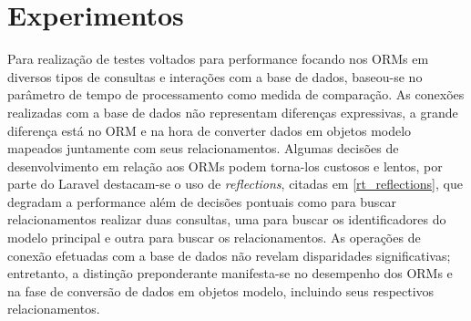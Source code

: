 \section{Experimentos}
Para realização de testes voltados para performance focando nos ORMs em diversos tipos de consultas e interações com a base de dados, baseou-se no parâmetro de tempo de processamento como medida de comparação. As conexões realizadas com a base de dados não representam diferenças expressivas, a grande diferença está no ORM e na hora de converter dados em objetos modelo mapeados juntamente com seus relacionamentos. Algumas decisões de desenvolvimento em relação aos ORMs podem torna-los custosos e lentos, por parte do Laravel destacam-se o uso de \textit{reflections}, citadas em \ref{rt_reflections}, que degradam a performance além de decisões pontuais como para buscar relacionamentos realizar duas consultas, uma para buscar os identificadores do modelo principal e outra para buscar os relacionamentos. As operações de conexão efetuadas com a base de dados não revelam disparidades significativas; entretanto, a distinção preponderante manifesta-se no desempenho dos ORMs e na fase de conversão de dados em objetos modelo, incluindo seus respectivos relacionamentos.